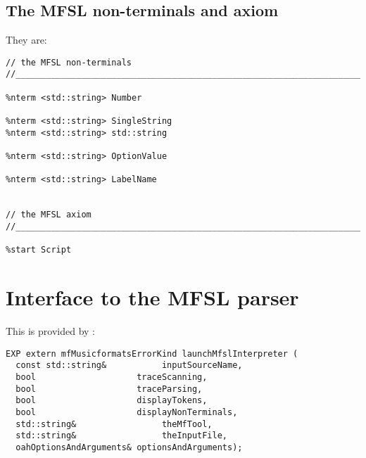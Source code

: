 \subsection{The MFSL non-terminals and axiom}

They are:
\begin{lstlisting}[language=Bison]
// the MFSL non-terminals
//_______________________________________________________________________________

%nterm <std::string> Number

%nterm <std::string> SingleString
%nterm <std::string> std::string

%nterm <std::string> OptionValue

%nterm <std::string> LabelName


// the MFSL axiom
//_______________________________________________________________________________

%start Script
\end{lstlisting}


\section{Interface to the MFSL parser}

This is provided by :
\begin{lstlisting}[language=Terminal]
EXP extern mfMusicformatsErrorKind launchMfslInterpreter (
  const std::string&           inputSourceName,
  bool                    traceScanning,
  bool                    traceParsing,
  bool                    displayTokens,
  bool                    displayNonTerminals,
  std::string&                 theMfTool,
  std::string&                 theInputFile,
  oahOptionsAndArguments& optionsAndArguments);
\end{lstlisting}

